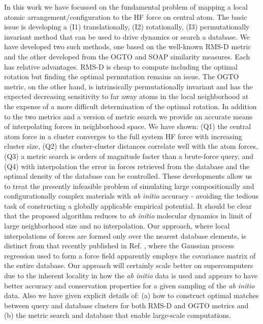 \documentclass[journal=jctcce,manuscript=article]{achemso}
\newcommand{\cref}[1]{{Ref. \citenum{#1}}}
\newcommand{\abinitio}{{\it ab initio }}
\begin{document}
In this work we have focussed on the fundamental problem of mapping a local atomic arrangement/configuration to the HF force on central atom.
The basic issue is developing a (I1) translationally, (I2) rotationally, (I3) permutationally invariant method that can be used to drive dynamics or search a database.
We have developed two such methods, one based on the well-known RMS-D metric and the other developed from the OGTO and SOAP similarity measures.
Each has relative advantages. 
RMS-D is cheap to compute including the optimal rotation but finding the optimal permutation remains an issue.
The OGTO metric, on the other hand, is intrinsically permutationally invariant  and has the expected decreasing sensitivity to far away atoms in the local neighborhood at the expense of a more difficult determination of the optimal rotation.
In addition to the two metrics and a version of metric search we provide an accurate means of interpolating forces in neighborhood space.
We have shown: (Q1) the central atom force in a cluster converges to the full system HF force with increasing cluster size, (Q2) the cluster-cluster distances correlate well with the atom forces, (Q3) a metric search is orders of magnitude faster than a brute-force query, and (Q4) with interpolation the error in forces retrieved from the database and the optimal density of the database can be controlled.
These developments allow us to treat the presently infeasible problem of simulating large compositionally and configurationally complex materials with \abinitio accuracy - avoiding the tedious task of constructing a globally applicable empirical potential.
It should be clear that the proposed algorithm reduces to \abinitio molecular dynamics in limit of large neighborhood size and no interpolation.
Our approach, where local interpolations of forces are formed only over the nearest database elements, is distinct from that recently published in \cref{li2015molecular}, where the Gaussian process regression used to form a force field apparently employs the covariance matrix of the entire database. 
Our approach will certainly scale better on supercomputers due to the inherent locality in how the \abinitio data is used and appears to have better accuracy and conservation properties for a given sampling of the \abinitio data. 
Also we have given explicit details of: (a) how to construct optimal matches between query and database clusters for both RMS-D and OGTO metrics and (b) the metric search and database that enable large-scale computations. 
\end{document}
